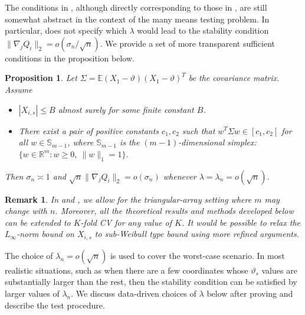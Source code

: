 \documentclass[11pt]{article}
\theoremstyle{plain}
\newtheorem{proposition}[theorem]{Proposition}
\newtheorem{remark}[theorem]{Remark}
\newcommand{\D}{{\mathcal{D}}}
\begin{document}
The conditions in , although directly corresponding to those in , are still somewhat abstract in the context of the many means testing problem. In particular,  does not specify which $\lambda$ would lead to the stability condition $\|\nabla_jQ_i\|_2=o(\sigma_n/\sqrt{n})$.  We provide a set of more transparent sufficient conditions in the proposition below.
\begin{proposition}
    \label{pro:5.3-suff-cond-argmin}
    Let $\Sigma=\mathbb E(X_1-\vartheta)(X_1-\vartheta)^T$ be the covariance matrix.
    Assume
    \begin{itemize}
        \item $|X_{i,s}|\le B$ almost surely for some finite constant $B$.
        \item There exist a pair of positive constants $c_1,c_2$ such that $w^T\Sigma w\in[c_1,c_2]$ for all $w\in \mathbb S_{m-1}$, where $\mathbb S_{m-1}$ is the $(m-1)$-dimensional simplex: $\{w\in \mathbb R^m:w\ge 0,~\|w\|_1=1\}$. 
    \end{itemize}
     Then $\sigma_n\asymp 1$ and $\sqrt{n}\|\nabla_j Q_i\|_2=o(\sigma_n)$ whenever $\lambda=\lambda_n=o(\sqrt{n})$.
\end{proposition}

\begin{remark}
    \label{rem:5.3-varying-m}
    In  and , we allow for the triangular-array setting where $m$ may change with $n$.
    Moreover, all the theoretical results and methods developed below can be extended to $K$-fold CV for any value of $K$.  It would be possible to relax the $L_\infty$-norm bound on $X_{i,s}$ to sub-Weibull type bound using more refined arguments.
\end{remark}

The choice of $\lambda_n=o(\sqrt{n})$ is used to cover the worst-case scenario. In most realistic situations, such as when there are a few coordinates whose $\vartheta_s$ values are substantially larger than the rest, then the stability condition can be satisfied by larger values of $\lambda_n$. We discuss data-driven choices of $\lambda$ below after proving  and describe the test procedure.
\end{document}
